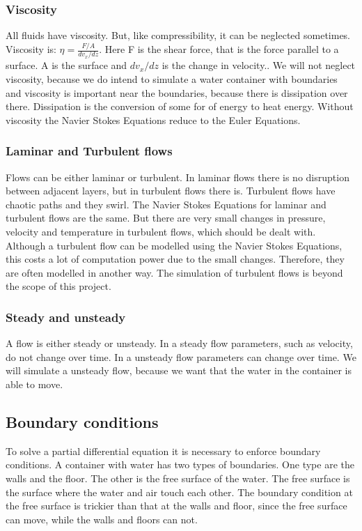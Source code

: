 \documentclass{article}
\begin{document}
\subsubsection{Viscosity}
All fluids have viscosity. But, like compressibility, it can be neglected sometimes. Viscosity is: \(\eta=\frac{F/A}{dv_{x}/dz }\). Here F is the shear force, that is the force parallel to a surface. A is the surface and \(dv_{x}/dz\) is the change in velocity.\cite{Viscosity}. We will not neglect viscosity, because we do intend to simulate a water container with boundaries and viscosity is important near the boundaries, because there is dissipation over there.\cite{NSE features} Dissipation is the conversion of some for of energy to heat energy\cite{Dissipation}. Without viscosity the Navier Stokes Equations reduce to the Euler Equations\cite{NSE features}.
\subsubsection{Laminar and Turbulent flows}
Flows can be either laminar or turbulent\cite{NSE features}. In laminar flows there is no disruption between adjacent layers, but in turbulent flows there is. Turbulent flows have chaotic paths and they swirl. The Navier Stokes Equations for laminar and turbulent flows are the same. But there are very small changes in pressure, velocity and temperature in turbulent flows, which should be dealt with. Although a turbulent flow can be modelled using the Navier Stokes Equations, this costs a lot of computation power due to the small changes.\cite{Turbulence} Therefore, they are often modelled in another way. The simulation of turbulent flows is beyond the scope of this project.
\subsubsection{Steady and unsteady} \label{(un)steady}
A flow is either steady or unsteady\cite{NSE features}. In a steady flow parameters, such as velocity, do not change over time. In a unsteady flow parameters can change over time.\cite{Steady and unsteady} We will simulate a unsteady flow, because we want that the water in the container is able to move.
\subsection{Boundary conditions}
To solve a partial differential equation it is necessary to enforce boundary conditions. A container with water has two types of boundaries. One type are the walls and the floor. The other is the free surface of the water. The free surface is the surface where the water and air touch each other. The boundary condition at the free surface is trickier than that at the walls and floor, since the free surface can move, while the walls and floors can not. 
\end{document}
